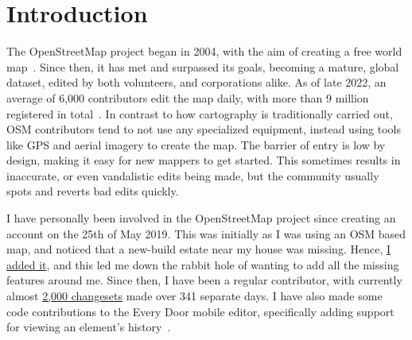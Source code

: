 \documentclass[]{final_report}
\begin{document}
\chapter{Introduction}

The OpenStreetMap project began in 2004, with the aim of creating a free world map~\cite[1]{RAMM:2011}. Since then, it has met and surpassed its goals, becoming a mature, global dataset, edited by both volunteers, and corporations alike. As of late 2022, an average of 6,000 contributors edit the map daily, with more than 9 million registered in total~\cite{OSMStats}. In contrast to how cartography is traditionally carried out, OSM contributors tend to not use any specialized equipment, instead using tools like GPS and aerial imagery to create the map. The barrier of entry is low by design, making it easy for new mappers to get started. This sometimes results in inaccurate, or even vandalistic edits being made, but the community usually spots and reverts bad edits quickly.

I have personally been involved in the OpenStreetMap project since creating an account on the 25th of May 2019. This was initially as I was using an OSM based map, and noticed that a new-build estate near my house was missing. Hence, \href{https://www.openstreetmap.org/changeset/70609319}{I added it}, and this led me down the rabbit hole of wanting to add all the missing features around me. Since then, I have been a regular contributor, with currently almost \href{https://www.openstreetmap.org/user/GeorgeHoneywood}{2,000 changesets} made over 341 separate days. I have also made some code contributions to the Every Door mobile editor, specifically adding support for viewing an element's history~\cite{every-door}. 
\end{document}
